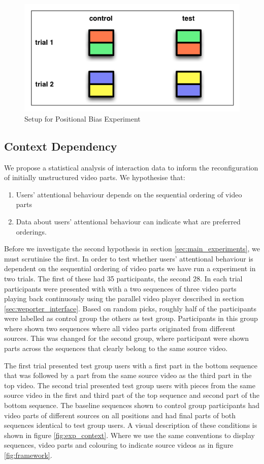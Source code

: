 \begin{figure}[htbp]
  \centering
    \includegraphics[width = .5\textwidth]{img/exp_posbias}
  \caption{Setup for Positional Bias Experiment}
  \label{fig:exp_posbias}
\end{figure}


\subsection{Context Dependency}
We propose a statistical analysis of interaction data to inform the reconfiguration of initially unstructured video parts. We hypothesise that:
\begin{enumerate}
  \item Users' attentional behaviour depends on the sequential ordering of video parts
  \item Data about users' attentional behaviour can indicate what are preferred orderings.
\end{enumerate}

Before we investigate the second hypothesis in section \ref{sec:main_experiments}, we must scrutinise the first. In order to test whether users' attentional behaviour is dependent on the sequential ordering of video parts we have run a experiment in two trials. The first of these had 35 participants, the second 28. In each trial participants were presented with with a two sequences of three video parts playing back continuously using the parallel video player described in section \ref{sec:weporter_interface}. Based on random picks, roughly half of the participants were labelled as control group the others as test group. Participants in this group where shown two sequences where all video parts originated from different sources. This was changed for the second group, where participant were shown parts across the sequences that clearly belong to the same source video. 

The first trial presented test group users with a first part in the bottom sequence that was followed by a part from the same source video as the third part in the top video. The second trial presented test group users with pieces from the same source video in the first and third part of the top sequence and second part of the bottom sequence. The baseline sequences shown to control group participants had video parts of different sources on all positions and had final parts of both sequences identical to test group users. A visual description of these conditions is shown in figure \ref{fig:exp_context}. Where we use the same conventions to display sequences, video parts and colouring to indicate source videos as in figure \ref{fig:framework}.

